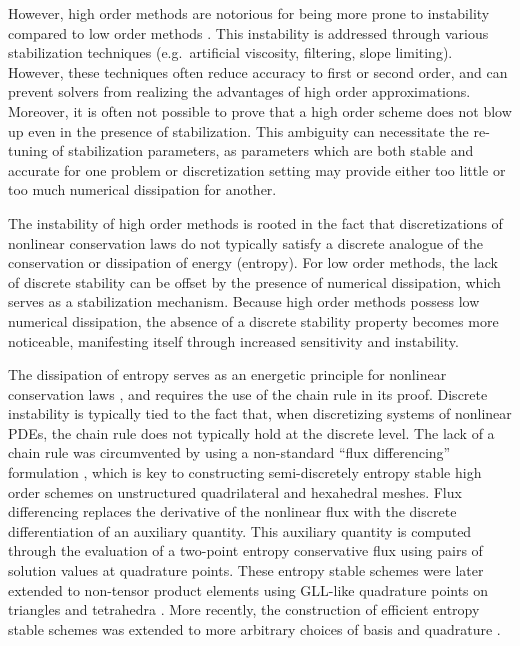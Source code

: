 \documentclass[onefignum,onetabnum,final]{siamart171218}
\begin{document}
However, high order methods are notorious for being more prone to instability compared to low order methods \cite{wang2013high}.  This instability is addressed through various stabilization techniques (e.g.\ artificial viscosity, filtering, slope limiting).  However, these techniques often reduce accuracy to first or second order, and can prevent solvers from realizing the advantages of high order approximations.  Moreover, it is often not possible to prove that a high order scheme does not blow up even in the presence of stabilization.  This ambiguity can necessitate the re-tuning of stabilization parameters, as parameters which are both stable and accurate for one problem or discretization setting  may provide either too little or too much numerical dissipation for another.  

The instability of high order methods is rooted in the fact that discretizations of nonlinear conservation laws do not typically satisfy a discrete analogue of the conservation or dissipation of energy (entropy).  For low order methods, the lack of discrete stability can be offset by the presence of numerical dissipation, which serves as a stabilization mechanism.  Because high order methods possess low numerical dissipation, the absence of a discrete stability property becomes more noticeable, manifesting itself through increased sensitivity and instability.  

The dissipation of entropy serves as an energetic principle for nonlinear conservation laws \cite{dafermos2005compensated}, and requires the use of the chain rule in its proof.  Discrete instability is typically tied to the fact that, when discretizing systems of nonlinear PDEs, the chain rule does not typically hold at the discrete level.  The lack of a chain rule was circumvented by using a non-standard ``flux differencing'' formulation \cite{fisher2013high, carpenter2014entropy, gassner2016split, gassner2017br1}, which is key to constructing semi-discretely entropy stable high order schemes on unstructured quadrilateral and hexahedral meshes.  Flux differencing replaces the derivative of the nonlinear flux with the discrete differentiation of an auxiliary quantity.  This auxiliary quantity is computed through the evaluation of a two-point entropy conservative flux \cite{tadmor1987numerical} using pairs of solution values at quadrature points.  These entropy stable schemes were later extended to non-tensor product elements using GLL-like quadrature points on triangles and tetrahedra \cite{chen2017entropy, crean2018entropy}.  More recently, the construction of efficient entropy stable schemes was extended to more arbitrary choices of basis and quadrature \cite{chan2017discretely, chan2018discretely}.  
\end{document}
